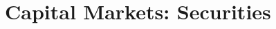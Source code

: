 \documentclass[a4paper, notitlepage]{report}
\begin{document}
\chapter{Capital Markets: Securities}

%
%
%
%

%
\end{document}
